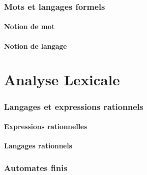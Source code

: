 \documentclass[9pt, handout]{beamer}
\begin{document}
 
\section{Mots et langages formels}
 
\subsection{Notion de mot}







 
\subsection{Notion de langage}



 
 
\part{Analyse Lexicale}
 
 
\section{Langages et expressions rationnels}
 
\subsection{Expressions rationnelles}





 
\subsection{Langages rationnels}




 
\section{Automates finis}
 
\end{document}
